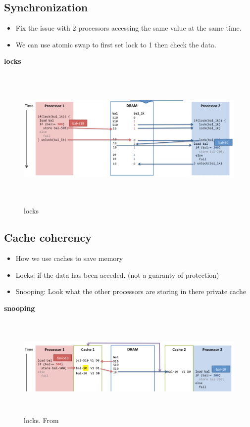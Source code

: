 \subsection{Synchronization}
\begin{itemize}
\item  Fix the issue with 2 processors accessing the same value at the same time.
\item  We can use atomic swap to first set lock to 1 then check the data.
\end{itemize}

\newpage

\textbf{locks}
\begin{figure}[h]
    \vspace{10mm}
    \centering
    \includegraphics[width=16cm, height=7cm]{image/locks.png}
    \caption{locks}
\end{figure}


\subsection{Cache coherency}
\begin{itemize}
\item  How we use caches to save memory
\item  Locks: if the data has been acceded. (not a guaranty of protection)
\item  Snooping: Look what the other processors are storing in there private cache   
\end{itemize}
  

\textbf{snooping}
\begin{figure}[h]
    \vspace{10mm}
    \centering
    \includegraphics[width=16cm, height=5cm]{image/snooping.png}
    \caption{locks. From \cite{}}
\end{figure}

